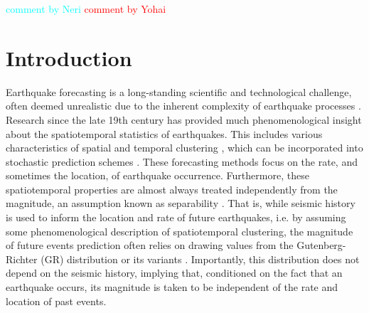 \documentclass[pdflatex]{sn-jnl}
\newcommand{\yohai}[1]{{\textcolor{red}{#1}}}
\newcommand{\neri}[1]{{\textcolor{cyan}{#1}}}
\begin{document}
\maketitle

\neri{comment by Neri} \newline
\yohai{comment by Yohai}


\section{Introduction} \label{sec:introduction}



Earthquake forecasting is a long-standing scientific and technological challenge, often deemed unrealistic due to the inherent complexity of earthquake processes \cite{bernard_earthquake_1999, geller_earthquakes_1997}. Research since the late 19th century has provided much phenomenological insight about the spatiotemporal statistics of earthquakes. This includes various characteristics of spatial and temporal clustering \cite{omori_after-shocks_1894, kagan_short-term_2004, ben-zion_localization_2020}, which can be incorporated into stochastic prediction schemes \cite{ogata_statistical_1988, hardebeck_aftershock_2024, devries_deep_2018, king_static_1994}. These forecasting methods focus on the rate, and sometimes the location, of earthquake occurrence. Furthermore, these spatiotemporal properties are almost always treated independently from the magnitude, an assumption known as separability \cite{schoenberg_testing_2004}. That is, while seismic history is used to inform the location and rate of future earthquakes, i.e. by assuming some phenomenological description of spatiotemporal clustering, the magnitude of future events prediction often relies on drawing values from the Gutenberg-Richter (GR) distribution or its variants \cite{gutenberg_frequency_1944, kagan_seismic_2002, ogata_exploring_2018}. Importantly, this distribution does not depend on the seismic history, implying that, conditioned on the fact that an earthquake occurs, its magnitude is taken to be independent of the rate and location of past events.

\end{document}

